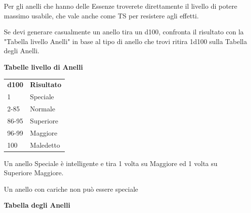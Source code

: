 \documentclass[a4paper,11pt,twoside,openany]{book}
\begin{document}
{Per gli anelli che hanno delle Essenze troverete direttamente il livello di potere massimo usabile, che vale anche come TS per resistere agli effetti.

Se devi generare casualmente un anello tira un d100, confronta il risultato con la "Tabella livello Anelli" in base al tipo di anello che trovi ritira 1d100 sulla Tabella degli Anelli.

\bigskip

\textbf{Tabelle livello di Anelli}

\medskip
\begin{tabular}{ll}
\toprule
\textbf{d100} & \textbf{Risultato}\tabularnewline
1 & Speciale\tabularnewline
2-85 & Normale\tabularnewline
86-95 & Superiore\tabularnewline
96-99 & Maggiore\tabularnewline
100 & Maledetto\tabularnewline

\end{tabular}

\bigskip

Un anello Speciale è intelligente e tira 1 volta su Maggiore ed 1 volta su Superiore Maggiore.

Un anello con cariche non può essere speciale

\pagebreak

\textbf{Tabella degli Anelli}

\medskip

}
\end{document}
